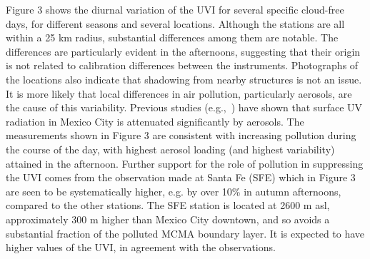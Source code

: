 \documentclass{article}
\begin{document}
Figure 3 %
 shows the diurnal variation of
the UVI for several specific cloud-free days, for different seasons and
several locations. Although the stations are all within a 25 km radius,
substantial differences among them are notable. The differences are
particularly evident in the afternoons, suggesting that their origin is
not related to calibration differences between the instruments.
Photographs of the locations also indicate that shadowing from nearby
structures is not an issue. It is more likely that local differences in
air pollution, particularly aerosols, are the cause of this variability.
Previous studies (e.g.,~\cite{Castro_2001,Palancar_2012}) have shown that surface UV
radiation in Mexico City is attenuated significantly by aerosols. The
measurements shown in Figure 3 %
are
consistent with increasing pollution during the course of the day, with
highest aerosol loading (and highest variability) attained in the
afternoon. Further support for the role of pollution in suppressing the
UVI comes from the observation made at Santa Fe (SFE) which in
Figure 3 %
 are seen to be systematically
higher, e.g. by over 10\% in autumn afternoons, compared to the other
stations. The SFE station is located at 2600 m asl, approximately 300 m
higher than Mexico City downtown, and so avoids a substantial fraction
of the polluted MCMA boundary layer. It is expected to have higher
values of the UVI, in agreement with the observations.
\end{document}
